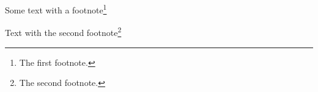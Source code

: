 \documentclass{article}
\begin{document}
Some text with a footnote\footnote{The first footnote.}

Text with the second footnote\footnote[4]{The second footnote.}
\end{document}
